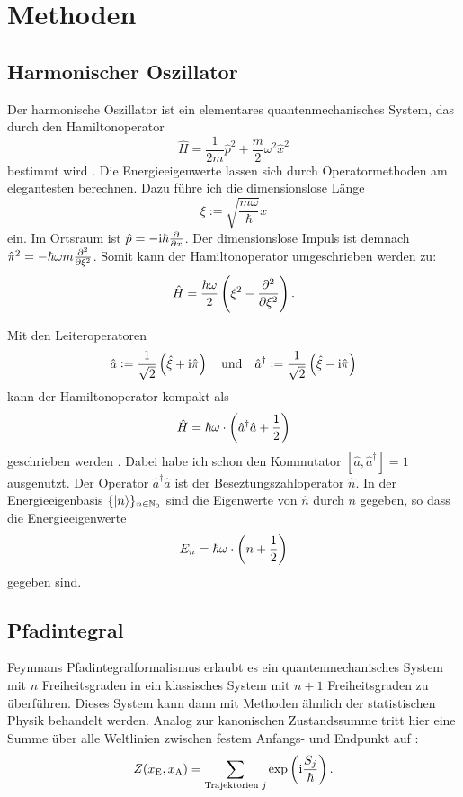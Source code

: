 
\chapter{Methoden}

\section{Harmonischer Oszillator}

Der harmonische Oszillator ist ein elementares quantenmechanisches System, das
durch den Hamiltonoperator
\[
    \hat H = \frac{1}{2m} \hat p^2 + \frac{m}{2} \omega^2 \hat x^2
\]
bestimmt wird \parencite[(3.1)]{Schwabl/Quantenmechanik}. Die Energieeigenwerte
lassen sich durch Operatormethoden am elegantesten berechnen. Dazu führe ich
die dimensionslose Länge
\[
    \xi := \sqrt{\frac{m\omega}{\hbar}} x
\]
ein. Im Ortsraum ist $\hat p = - \iup \hbar \pd{}x$. Der dimensionslose Impuls
ist demnach $\hat \pi^2 = - \hbar\omega m \pd[2]{}\xi$. Somit kann der
Hamiltonoperator umgeschrieben werden zu:
\[
    \hat H = \frac{\hbar\omega}2 \del{\xi^2 - \dpd[2]{}\xi}.
\]

Mit den Leiteroperatoren
\[
    \hat a := \frac1{\sqrt2} \del{\hat \xi + \iup \hat \pi}
    \quad\text{und}\quad
    \hat a^\dagger := \frac1{\sqrt2} \del{\hat \xi - \iup \hat \pi}
\]
kann der Hamiltonoperator kompakt als
\[
    \hat H = \hbar\omega \cdot \del{\hat a^\dagger \hat a + \frac12}
\]
geschrieben werden \parencite[(3.8)]{Schwabl/Quantenmechanik}. Dabei habe ich
schon den Kommutator $[\hat a, \hat a^\dagger] = 1$ ausgenutzt. Der Operator
$\hat a^\dagger \hat a$ ist der Beseztungszahloperator $\hat n$. In der
Energieeigenbasis $\{ \ket n \}_{n \in \mathbb N_0}$ sind die Eigenwerte von $\hat n$
durch $n$ gegeben, so dass die Energieeigenwerte
\[
    E_n = \hbar\omega \cdot \del{n + \frac 12}
\]
gegeben sind.


\section{Pfadintegral}

Feynmans Pfadintegralformalismus erlaubt es ein quantenmechanisches System mit
$n$ Freiheitsgraden in ein klassisches System mit $n+1$ Freiheitsgraden zu
überführen. Dieses System kann dann mit Methoden ähnlich der statistischen
Physik behandelt werden. Analog zur kanonischen Zustandssumme tritt hier eine
Summe über alle Weltlinien zwischen festem Anfangs- und Endpunkt auf
\parencite[(2.7)]{Creutz/Statistical_Approach_QM}:
\[
    Z(x_\text E, x_\text A) = \sum_{\text{Trajektorien $j$}} \exp\del{ \iup
    \frac{S_j}{\hbar}}.
\]

